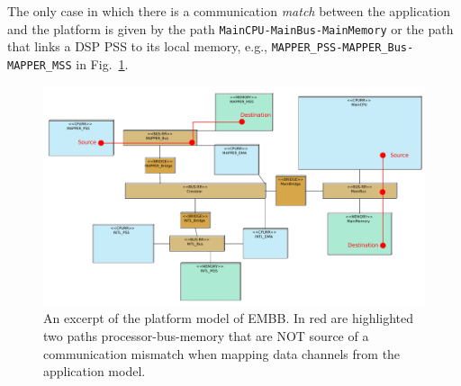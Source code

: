 \documentclass{llncs}
\begin{document}
%
The only case in which there is a communication \textit{match} between the application and the platform is given by the
path \texttt{MainCPU-MainBus-MainMemory} or the path that links a DSP PSS to its local memory, e.g.,
\texttt{MAPPER\_\-PSS-MAPPER\_\-Bus-MAPPER\_\-MSS} in Fig.~\ref{fig:CommMismatchesPaths}.
%
\begin{figure}[!htbp]
	\centering
	\includegraphics[angle=-90,origin=c,height=0.8\paperwidth]{figures/evaluation/CommMismatchesPaths.pdf}
  \caption{An excerpt of the platform model of EMBB. In red are highlighted two paths processor\--bus\--memory that are NOT source
	of a communication mismatch when mapping data channels from the application model.}
	\label{fig:CommMismatchesPaths}
\end{figure}
%
\newpage
\end{document}
